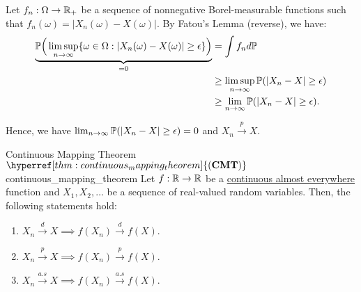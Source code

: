 \begin{proof*}
    Let $f_n:\Omega\to\mathbb{R}_+$ be a sequence of nonnegative Borel-measurable functions such that $f_n(\omega)=|X_n(\omega) - X(\omega)|$. By Fatou's Lemma (reverse), we have:
    \begin{align*}
        \underbrace{\mathbb{P}\Big( \limsup_{n\to\infty} \{\omega\in\Omega:|X_n(\omega) - X(\omega)| \ge \epsilon\} \Big)}_{=0} &= \int f_nd\mathbb{P} \\ 
        &\ge \limsup_{n\to\infty}\mathbb{P}(|X_n - X|\ge\epsilon) \\
        &\ge \lim_{n\to\infty}\mathbb{P}(|X_n - X|\ge\epsilon).
    \end{align*}

    \noindent Hence, we have $\lim_{n\to\infty}\mathbb{P}(|X_n-X|\ge\epsilon)=0$ and $X_n\xrightarrow{p}X$.
\end{proof*}

\newcommand{\CMT}{\hyperref[thm:continuous_mapping_theorem]{(\mathrm{{\bf CMT}})}}
\begin{theorem}{Continuous Mapping Theorem $\CMT$}{continuous_mapping_theorem}
    Let $f:\mathbb{R}\to\mathbb{R}$ be a \underline{continuous almost everywhere} function and $X_1, X_2, \dots$ be a sequence of real-valued random variables. Then, the following statements hold:
    \begin{enumerate}
        \item $X_n\xrightarrow{d}X \implies   f(X_n)\xrightarrow{d}f(X)$.
        \item $X_n\xrightarrow{p}X \implies   f(X_n)\xrightarrow{p}f(X)$.
        \item $X_n\xrightarrow{a.s}X \implies f(X_n)\xrightarrow{a.s}f(X)$.
    \end{enumerate}
\end{theorem}

